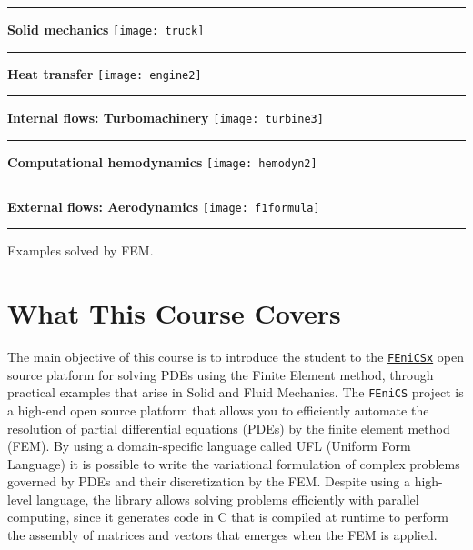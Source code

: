 \begin{marginfigure}[-4.0cm]
	\hrule
	\vspace{0.1cm}
	\flushleft \textbf{\scriptsize Solid mechanics}
	\texttt{[image: truck]}
	\vspace{0.1cm}       
	\hrule
	\vspace{0.1cm}
	\textbf{\scriptsize Heat transfer}
	\texttt{[image: engine2]}
	\vspace{0.1cm}       
	\hrule
	\vspace{0.1cm}
	\textbf{\scriptsize Internal flows: Turbomachinery}
	\texttt{[image: turbine3]}
	\vspace{0.1cm}
	\hrule
	\vspace{0.1cm}
	\textbf{\scriptsize Computational hemodynamics}
	\texttt{[image: hemodyn2]}
	\vspace{0.1cm}~\\
	\hrule
	\vspace{0.1cm}
	\textbf{\scriptsize External flows: Aerodynamics}
	\texttt{[image: f1formula]}
	\vspace{0.1cm} 
	\hrule
	\caption[]{Examples solved by FEM.}
\end{marginfigure}

\section{What This Course Covers}

The main objective of this course is to introduce the student to the \href{https://fenicsproject.org/}{\texttt{FEniCSx}} open source platform for solving PDEs using the Finite Element method, through practical examples that arise in Solid and Fluid Mechanics.
The \texttt{FEniCS} project is a high-end open source platform that allows you to efficiently automate the resolution of partial differential equations (PDEs) by the finite element method (FEM). By using  a domain-specific language called UFL (Uniform Form Language) it is possible to write the variational formulation of complex problems governed by PDEs and their discretization by the FEM. Despite using a high-level language, the library allows solving problems efficiently with parallel computing, since it generates code in C that is compiled at runtime to perform the assembly of matrices and vectors that emerges when the FEM is applied. 

